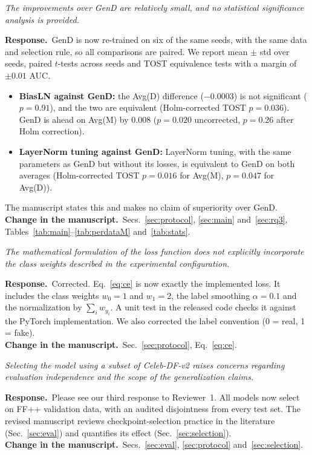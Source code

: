\documentclass[11pt]{article}
\newenvironment{comment}{\par\medskip\noindent\begin{minipage}{\linewidth}\color{black!70}\itshape}{\end{minipage}\par\smallskip}
\newcommand{\resp}{\noindent\textbf{Response.}~}
\newcommand{\change}{\noindent\textbf{Change in the manuscript.}~}
\begin{document}
\begin{comment}
The improvements over GenD are relatively small, and no statistical significance analysis is provided.
\end{comment}
\resp GenD is now re-trained on six of the same seeds, with the same data and selection rule, so all comparisons are paired. We report mean $\pm$ std over seeds, paired $t$-tests across seeds and TOST equivalence tests with a margin of $\pm0.01$ AUC.
\begin{itemize}
\item \textbf{BiasLN against GenD:} the Avg(D) difference ($-0.0003$) is not significant ($p=0.91$), and the two are equivalent (Holm-corrected TOST $p=0.036$). GenD is ahead on Avg(M) by 0.008 ($p=0.020$ uncorrected, $p=0.26$ after Holm correction).
\item \textbf{LayerNorm tuning against GenD:} LayerNorm tuning, with the same parameters as GenD but without its losses, is equivalent to GenD on both averages (Holm-corrected TOST $p=0.016$ for Avg(M), $p=0.047$ for Avg(D)).
\end{itemize}
The manuscript states this and makes no claim of superiority over GenD.\\
\change Secs.~\ref{sec:protocol}, \ref{sec:main} and~\ref{sec:rq3}, Tables~\ref{tab:main}--\ref{tab:perdataM} and~\ref{tab:stats}.

\begin{comment}
The mathematical formulation of the loss function does not explicitly incorporate the class weights described in the experimental configuration.
\end{comment}
\resp Corrected. Eq.~\eqref{eq:ce} is now exactly the implemented loss. It includes the class weights $w_0=1$ and $w_1=2$, the label smoothing $\alpha=0.1$ and the normalization by $\sum_i w_{y_i}$. A unit test in the released code checks it against the PyTorch implementation. We also corrected the label convention (0 = real, 1 = fake).\\
\change Sec.~\ref{sec:protocol}, Eq.~\eqref{eq:ce}.

\begin{comment}
Selecting the model using a subset of Celeb-DF-v2 raises concerns regarding evaluation independence and the scope of the generalization claims.
\end{comment}
\resp Please see our third response to Reviewer~1. All models now select on FF++ validation data, with an audited disjointness from every test set. The revised manuscript reviews checkpoint-selection practice in the literature (Sec.~\ref{sec:eval}) and quantifies its effect (Sec.~\ref{sec:selection}).\\
\change Secs.~\ref{sec:eval}, \ref{sec:protocol} and~\ref{sec:selection}.
\end{document}
